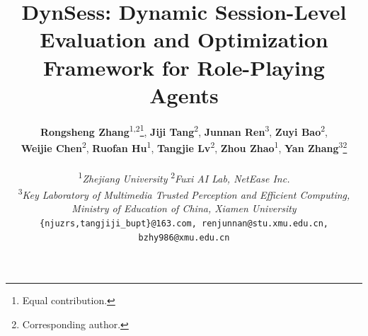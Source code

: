 \documentclass[11pt]{article}
\title{DynSess: Dynamic Session-Level Evaluation and Optimization Framework for Role-Playing Agents}
\author{
  \textbf{Rongsheng Zhang}\textsuperscript{1,2}\thanks{Equal contribution.},
  \textbf{Jiji Tang}\textsuperscript{2}\footnotemark[1],
  \textbf{Junnan Ren}\textsuperscript{3}\footnotemark[1],
  \textbf{Zuyi Bao}\textsuperscript{2},
  \\
  \textbf{Weijie Chen}\textsuperscript{2},
  \textbf{Ruofan Hu}\textsuperscript{1},
  \textbf{Tangjie Lv}\textsuperscript{2},
  \textbf{Zhou Zhao}\textsuperscript{1},
  \textbf{Yan Zhang}\textsuperscript{3}\thanks{Corresponding author.}
\\
\\
  \textsuperscript{1}\textit{Zhejiang University} \quad
  \textsuperscript{2}\textit{Fuxi AI Lab, NetEase Inc.} \\
  \textsuperscript{3}\textit{Key Laboratory of Multimedia Trusted Perception and Efficient Computing,} \\
  \textit{Ministry of Education of China, Xiamen University} \\
{\small\texttt{\{njuzrs,tangjiji\_bupt\}@163.com, renjunnan@stu.xmu.edu.cn, bzhy986@xmu.edu.cn}}
}
\begin{document}
\maketitle
\begin{abstract}



\end{abstract}
\end{document}
